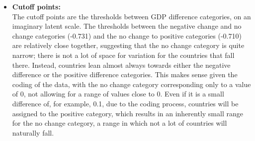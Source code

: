 \documentclass[12pt,letterpaper]{article}
\begin{document}
\begin{enumerate}
\begin{itemize}
\begin{table}[!htbp]
		\end{table} 
		\item \textbf{Cutoff points: } \\[0.2cm]
		The cutoff points are the thresholds between GDP difference categories, on an imaginary latent scale. The thresholds between the negative change and no change categories (-0.731) and the no change to positive categories (-0.710) are relatively close together, suggesting that the no change category is quite narrow; there is not a lot of space for variation for the countries that fall there. Instead, countries lean almost always towards either the negative difference or the positive difference categories. This makes sense given the coding of the data, with the no change category corresponding only to a value of 0, not allowing for a range of values close to 0. Even if it is a small difference of, for example, 0.1, due to the coding process, countries will be assigned to the positive category, which results in an inherently small range for the no change category, a range in which not a lot of countries will naturally fall.  
	\end{itemize}
\end{enumerate}
\newpage 
\end{document}

